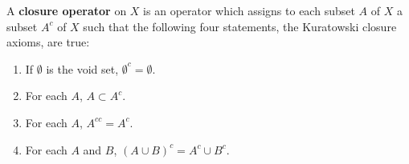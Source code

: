 A \textbf{closure operator} on $X$ is an operator which assigns to each subset $A$ of $X$ a subset $A^{c}$ of $X$ such that the following four statements, the Kuratowski closure axioms, are true:
\begin{enumerate}
\item[(a)] If $\emptyset$ is the void set, $\emptyset^{c} = \emptyset$.
\item[(b)] For each $A$, $A \subset A^{c}$.
\item[(c)] For each $A$, $A^{cc} = A^{c}$.
\item[(d)] For each $A$ and $B$, $(A \cup B)^{c} = A^{c} \cup B^{c}$.
\end{enumerate}
